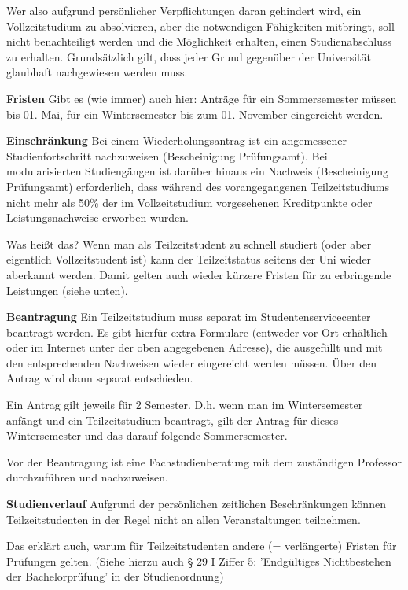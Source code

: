 Wer also aufgrund persönlicher Verpflichtungen daran gehindert wird, ein Vollzeitstudium zu absolvieren, aber die notwendigen Fähigkeiten mitbringt, soll nicht benachteiligt werden und die Möglichkeit erhalten, einen Studienabschluss zu erhalten. Grundsätzlich gilt, dass jeder Grund gegenüber der Universität glaubhaft nachgewiesen werden muss.


\textbf{Fristen} \newline
Gibt es (wie immer) auch hier: Anträge für ein Sommersemester müssen bis 01. Mai, für ein Wintersemester bis zum 01. November eingereicht werden. 


\textbf{Einschränkung} \newline
Bei einem Wiederholungsantrag ist ein angemessener Studienfortschritt nachzuweisen (Bescheinigung Prüfungsamt). Bei modularisierten Studiengängen ist darüber hinaus ein Nachweis (Bescheinigung Prüfungsamt) erforderlich, dass während des vorangegangenen Teilzeitstudiums nicht mehr als 50\% der im Vollzeitstudium vorgesehenen Kreditpunkte oder Leistungsnachweise erworben wurden. 

Was heißt das?
Wenn man als Teilzeitstudent zu schnell studiert (oder aber eigentlich Vollzeitstudent ist) kann der Teilzeitstatus seitens der Uni wieder aberkannt werden. Damit gelten auch wieder kürzere Fristen für zu erbringende Leistungen (siehe unten).

\vspace{5mm}
\textbf{Beantragung} \newline
Ein Teilzeitstudium muss separat im Studentenservicecenter beantragt werden. Es gibt hierfür extra Formulare (entweder vor Ort erhältlich oder im Internet unter der oben angegebenen Adresse), die ausgefüllt und mit den entsprechenden Nachweisen wieder eingereicht werden müssen. Über den Antrag wird dann separat entschieden.

Ein Antrag gilt jeweils für 2 Semester. D.h. wenn man im Wintersemester anfängt und ein Teilzeitstudium beantragt, gilt der Antrag für dieses Wintersemester und das darauf folgende Sommersemester.

Vor der Beantragung ist  eine Fachstudienberatung mit dem zuständigen Professor durchzuführen und nachzuweisen.


\textbf{Studienverlauf} \newline
Aufgrund der persönlichen zeitlichen Beschränkungen können Teilzeitstudenten in der Regel nicht an allen Veranstaltungen teilnehmen.

Das erklärt auch, warum für Teilzeitstudenten andere (= verlängerte) Fristen für Prüfungen gelten.
(Siehe hierzu auch § 29 I Ziffer 5:  'Endgültiges Nichtbestehen der Bachelorprüfung' in der Studienordnung)

